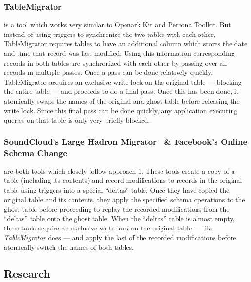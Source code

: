 \documentclass[conference]{IEEEtran}
\begin{document}
\subsubsection{TableMigrator~\cite{TableMigrator}}
is a tool which works very similar to Openark Kit and Percona Toolkit. But instead of using triggers to synchronize the two tables with each other,  TableMigrator requires tables to have an additional column which stores the date and time that record was last modified. Using this information corresponding records in both tables are synchronized with each other by passing over all records in multiple passes. Once a pass can be done relatively quickly, TableMigrator acquires an exclusive write lock on the original table --- blocking the entire table --- and proceeds to do a final pass. Once this has been done, it atomically swaps the names of the original and ghost table before releasing the write lock. Since this final pass can be done quickly, any application executing queries on that table is only very briefly blocked.

\subsubsection{SoundCloud's Large Hadron Migrator~\cite{SoundcloudLHM} \& Facebook's Online Schema Change~\cite{FacebookOSC}}
are both tools which closely follow approach 1. These tools create a copy of a table (including its contents) and record modifications to records in the original table using triggers into a special ``deltas'' table. Once they have copied the original table and its contents, they apply the specified schema operations to the ghost table before proceeding to replay the recorded modifications from the ``deltas'' table onto the ghost table. When the ``deltas'' table is almost empty, these tools acquire an exclusive write lock on the original table --- like \textit{TableMigrator} does --- and apply the last of the recorded modifications before atomically switch the names of both tables.

\subsection{Research}
\end{document}
